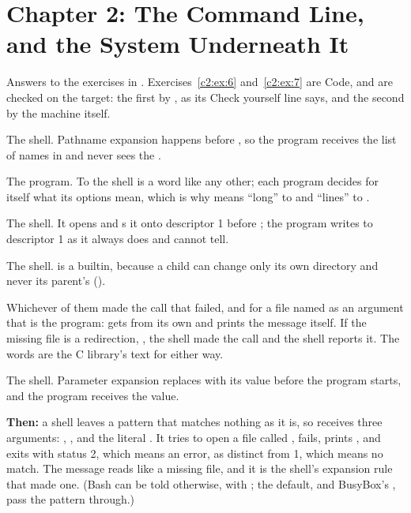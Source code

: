 
\section{Chapter 2: The Command Line, and the System Underneath It}
\label{sol:sec:c2}
Answers to the exercises in . Exercises~\ref{c2:ex:6} and~\ref{c2:ex:7}
are Code, and are checked on the target: the first by , as its Check yourself
line says, and the second by the machine itself.


 The shell. Pathname expansion happens before , so the program receives the
list of names in  and never sees the \code{*}.

 The program. To the shell  is a word like any other; each program decides for
itself what its options mean, which is why  means ``long'' to  and ``lines'' to
.

 The shell. It opens  and s it onto descriptor 1 before
; the program writes to descriptor 1 as it always does and cannot tell.

 The shell.  is a builtin, because a child can change only its own directory and
never its parent's ().

 Whichever of them made the call that failed, and for a file named as an argument that is
the program:  gets  from its own  and prints the message
itself. If the missing file is a redirection, , the shell made the call and the
shell reports it. The words are the C library's text for  either way.

 The shell. Parameter expansion replaces  with its value before the program
starts, and the program receives the value.

\textbf{Then:} a shell leaves a pattern that matches nothing as it is, so  receives three
arguments: , , and the literal . It tries to open a file called
, fails, prints , and exits with status 2,
which means an error, as distinct from 1, which means no match. The message reads like a missing
file, and it is the shell's expansion rule that made one. (Bash can be told otherwise, with
; the default, and BusyBox's , pass the pattern through.)

